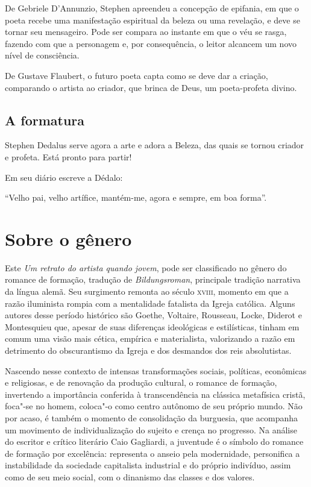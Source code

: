 De Gebriele D'Annunzio, Stephen apreendeu a concepção de epifania, em
que o poeta recebe uma manifestação espiritual da beleza ou uma
revelação, e deve se tornar seu mensageiro. Pode ser compara ao instante
em que o véu se rasga, fazendo com que a personagem e, por consequência,
o leitor alcancem um novo nível de consciência.

De Gustave Flaubert, o futuro poeta capta como se deve dar a criação,
comparando o artista ao criador, que brinca de Deus, um poeta-profeta
divino.

\subsection{A formatura}

Stephen Dedalus serve agora a arte e adora a Beleza, das quais se tornou
criador e profeta. Está pronto para partir!

Em seu diário escreve a Dédalo:

``Velho pai, velho artífice, mantém-me, agora e sempre, em boa forma''.


\section{Sobre o gênero}

Este \textit{Um retrato do artista
quando jovem}, pode ser classificado no gênero do romance de formação, tradução
de \textit{Bildungsroman}, principale tradição narrativa da língua alemã.
Seu surgimento remonta ao século \textsc{xviii}, momento em que a razão iluminista
rompia com a mentalidade fatalista da Igreja católica.
Alguns autores desse período histórico são Goethe, Voltaire, Rousseau, Locke, Diderot e Montesquieu que, apesar de suas diferenças ideológicas e estilísticas, tinham em comum
uma visão mais cética, empírica e materialista, valorizando a razão em detrimento do obscurantismo da Igreja e dos desmandos dos reis absolutistas.

Nascendo nesse contexto de intensas transformações sociais, políticas, econômicas e religiosas, e de renovação da produção cultural, o romance de formação, invertendo a importância conferida à transcendência na clássica metafísica cristã, foca"-se no homem, coloca"-o como centro autônomo de seu próprio mundo. Não por acaso, é também o momento de consolidação da burguesia, que acompanha um movimento de individualização do sujeito e crença no progresso. Na análise do escritor e crítico literário Caio Gagliardi, a juventude é o símbolo do romance de formação por excelência: representa o anseio pela modernidade, personifica a instabilidade da sociedade capitalista industrial e do próprio indivíduo, assim como de seu meio social, com o dinanismo das classes e dos valores.


